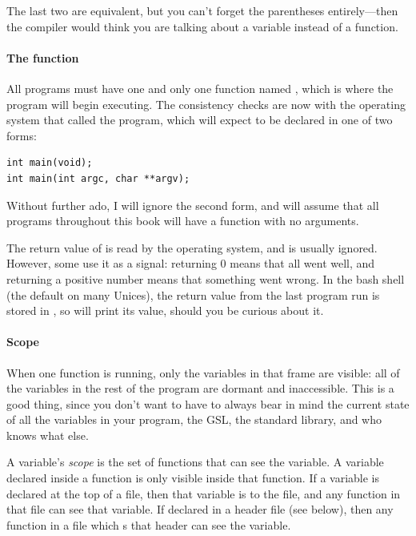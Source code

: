 \documentclass[12pt]{article}
\makeatletter
\def\ind#1{\index{#1}#1}
\def\cindex#1{\index{#1@\ci{#1}}}
\makeatother
\begin{document}
The last two are equivalent, but you can't forget the parentheses
entirely---then the compiler would think you are talking about a variable
instead of a function.

\paragraph{\treesymbol{} The  function}\cindex{main}
All programs must have one and only one function named ,
which is where the program will begin executing. The consistency checks
are now with the operating system that called the program, which will
expect  to be declared in one of two forms:

\begin{lstlisting}
int main(void);
int main(int argc, char **argv);
\end{lstlisting}

Without further ado, I will ignore the second form, and will assume that
all programs throughout this book will have a  function
with no arguments.

The return value of  is read by the operating system,
and is usually ignored. However, some use it as a signal:  returning
0 means that all went well, and returning a positive number means that
something went wrong. In the \ind{bash} shell (the default on many
Unices), the return value from the last program run is stored in
, so  will print its value, should you
be curious about it.

\paragraph{Scope}	\label{scope}

When one function is running, only the variables in that frame are
visible: all of the variables in the rest of the program are 
dormant and inaccessible.  This is a good thing, since you 
don't want to have to always bear in mind the current state of all the
variables in your program, the GSL, the standard library, and who knows
what else.

A variable's {\sl scope} is the set of functions that can see the
variable. A variable declared inside a function is only visible inside
that function.  If a variable is declared at the top of a file, then
that variable is  to the file, and any function in that
file can see that variable. If declared in a header file (see below),
then any function in a file which s that header  can see
the variable.
\end{document}
